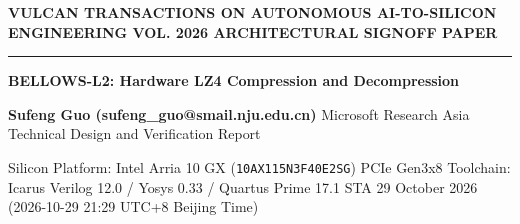 \documentclass[11pt,a4paper]{article}
\begin{document}
{\scriptsize\sffamily\textcolor{vulcan}{\textbf{VULCAN TRANSACTIONS ON AUTONOMOUS AI-TO-SILICON ENGINEERING \hfill VOL. 2026 \textperiodcentered{} ARCHITECTURAL SIGNOFF PAPER}}\par}

\vspace{1pt}\textcolor{vulcan}{\rule{\textwidth}{1.2pt}}\vspace{4pt}

\begin{center}

{\sffamily\LARGE\bfseries BELLOWS-L2: Hardware LZ4 Compression and Decompression\par}\vspace{3pt}

{\small\sffamily\textbf{Sufeng Guo (\allowbreak{}sufeng\_\allowbreak{}guo@smail.nju.edu.cn)\allowbreak{}} \textperiodcentered{} Microsoft Research Asia \textperiodcentered{} Technical Design and Verification Report\par}\vspace{1pt}

{\scriptsize\sffamily\textcolor{black!75}{Silicon Platform: Intel Arria 10 GX (\texttt{10AX115N3F40E2SG}) PCIe Gen3x8 \textperiodcentered{} Toolchain: Icarus Verilog 12.0 / Yosys 0.33 / Quartus Prime 17.1 STA \textperiodcentered{} 29 October 2026 (\allowbreak{}2026-10-29 21:29 UTC+\allowbreak{}8 Beijing Time)\allowbreak{}}\par}

\end{center}\vspace{2pt}
\end{document}
